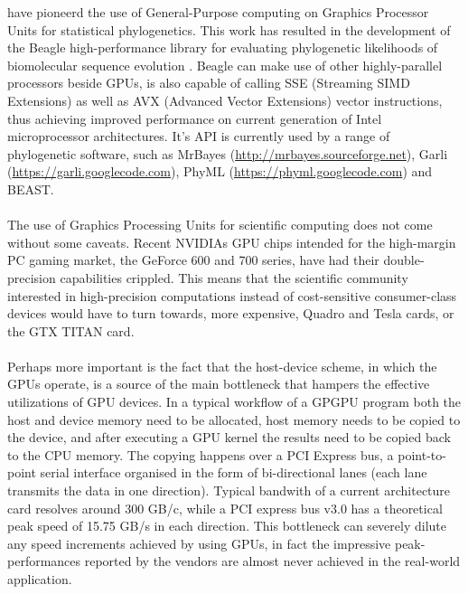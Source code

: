 \cite{Suchard2009} have pioneerd the use of General-Purpose computing on Graphics Processor Units for statistical phylogenetics.
This work has resulted in the development of the Beagle high-performance library for  evaluating phylogenetic likelihoods of biomolecular sequence evolution \citep{Ayres2012}.
Beagle can make use of other highly-parallel processors beside GPUs, is also capable of calling SSE (Streaming SIMD Extensions) as well as AVX (Advanced Vector Extensions) vector instructions, thus achieving improved performance on current generation of Intel microprocessor architectures.
It's API is currently used by a range of phylogenetic software, such as MrBayes (\url{http://mrbayes.sourceforge.net}), Garli (\url{https://garli.googlecode.com}), PhyML (\url{https://phyml.googlecode.com}) and BEAST.

\paragraph{}
The use of Graphics Processing Units for scientific computing does not come without some caveats.
Recent NVIDIAs GPU chips intended for the high-margin PC gaming market, the GeForce 600 and 700 series, have had their double-precision capabilities crippled.
This means that the scientific community interested in high-precision computations instead of cost-sensitive consumer-class devices would have to turn towards, more expensive, Quadro and Tesla cards, or the GTX TITAN card.

\paragraph{}
Perhaps more important is the fact that the host-device scheme, in which the GPUs operate, is a source of the main bottleneck that hampers the  effective utilizations of GPU devices.
In a typical workflow of a GPGPU program both the host and device memory need to be allocated, host memory needs to be copied to the device, and after executing a GPU kernel the results need to be copied back to the CPU memory.
The copying happens over a PCI Express bus, a point-to-point serial interface organised in the form of bi-directional lanes (each lane transmits the data in one direction).
Typical bandwith of a current architecture card resolves around $300$ GB/c, while a PCI express bus v3.0 has a theoretical peak speed of 15.75 GB/s in each direction.
This bottleneck can severely dilute any speed increments achieved by using GPUs, in fact the impressive peak-performances reported by the vendors are almost never achieved in the real-world application.

